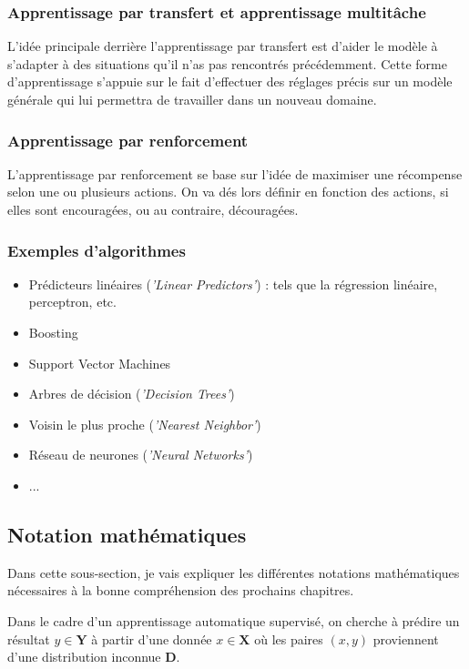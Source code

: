 \documentclass[a4paper]{article}
\begin{document}
\subsubsection{Apprentissage par transfert et apprentissage multitâche}
L'idée principale derrière l'apprentissage par transfert est d'aider le modèle à s'adapter à des situations qu'il n'as pas rencontrés précédemment. Cette forme d'apprentissage s'appuie sur le fait d'effectuer des réglages précis sur un modèle générale qui lui permettra de travailler dans un nouveau domaine.

\newpage

\subsubsection{Apprentissage par renforcement}
L'apprentissage par renforcement se base sur l'idée de maximiser une récompense selon une ou plusieurs actions. On va dés lors définir en fonction des actions, si elles sont encouragées, ou au contraire, découragées.

\subsubsection{Exemples d'algorithmes}

\begin{itemize}
	\item Prédicteurs linéaires (\textit{'Linear Predictors'}) : tels que la régression linéaire, perceptron, etc.
	\item Boosting
	\item Support Vector Machines
	\item Arbres de décision (\textit{'Decision Trees'})
	\item Voisin le plus proche (\textit{'Nearest Neighbor'})
	\item Réseau de neurones (\textit{'Neural Networks'})
	\item ...
\end{itemize}

\newpage

\subsection{Notation mathématiques}
Dans cette sous-section, je vais expliquer les différentes notations mathématiques nécessaires à la bonne compréhension des prochains chapitres. \newline

Dans le cadre d'un apprentissage automatique supervisé, on cherche à prédire un résultat $y\in \bm{Y}$ à partir d'une donnée $x \in \bm{X}$ où les paires $(x,y)$ proviennent d'une distribution inconnue $\bm{D}$. \newline
\end{document}
